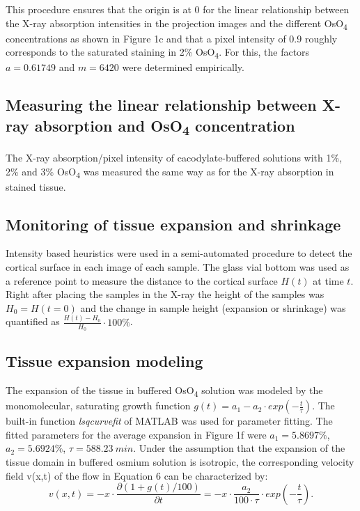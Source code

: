 \documentclass{article}
\begin{document}
This procedure ensures that the origin is at 0 for the linear relationship between the X-ray absorption intensities in the projection images and the different OsO\textsubscript{4} concentrations as shown in Figure 1c and that a pixel intensity of 0.9 roughly corresponds to the saturated staining in 2\% OsO\textsubscript{4}. For this, the factors $a = 0.61749$ and $m = 6420$ were determined empirically.

\subsection*{Measuring the linear relationship between X-ray absorption and OsO\textsubscript{4} concentration}
The X-ray absorption/pixel intensity of cacodylate-buffered solutions with 1\%, 2\% and 3\% OsO\textsubscript{4} was measured the same way as for the X-ray absorption in stained tissue.

\subsection*{Monitoring of tissue expansion and shrinkage}
Intensity based heuristics were used in a semi-automated procedure to detect the cortical surface in each image of each sample. The glass vial bottom was used as a reference point to measure the distance to the cortical surface $H\left(t\right)$ at time $t$. Right after placing the samples in the X-ray the height of the samples was $H_{0} = H\left(t=0\right)$ and the change in sample height (expansion or shrinkage) was quantified as $\frac{H(t)-H_{0}}{H_{0}}\cdot 100\%$.

\subsection*{Tissue expansion modeling}
The expansion of the tissue in buffered OsO\textsubscript{4} solution was modeled by the monomolecular, saturating growth function $g\left(t\right) = a_{1} - a_{2}\cdot exp\left(-\frac{t}{\tau}\right)$. The built-in function \emph{lsqcurvefit} of MATLAB was used for parameter fitting. The fitted parameters for the average expansion in Figure 1f were $a_{1} = 5.8697\%$, $a_{2} = 5.6924\%$, $\tau = 588.23\ min$. Under the assumption that the expansion of the tissue domain in buffered osmium solution is isotropic, the corresponding velocity field v(x,t) of the flow in Equation 6 can be characterized by:
\begin{equation*}
v\left(x,t\right) = -x\cdot\frac{\partial\left(1+g\left(t\right)/100\right)}{\partial t} = -x\cdot\frac{a_{2}}{100\cdot\tau}\cdot exp\left(-\frac{t}{\tau}\right).
\end{equation*}
\end{document}
